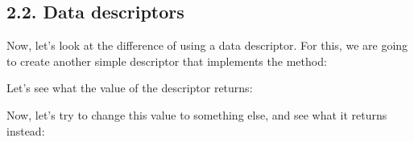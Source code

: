 \documentclass[a4paper,10pt,english]{sphinxmanual}
\begin{document}
\subsection{2.2. Data descriptors}
\label{\detokenize{chapters/6_descriptors/index:data-descriptors}}
Now, let’s look at the difference of using a data descriptor. For this, we are going to create
another simple descriptor that implements the  method:

\begin{sphinxVerbatim}[commandchars=\\\{\}]
 
       
           
             
         

       
          
        \PYG{p}{[}\PYG{p}{]}  

 
      
\end{sphinxVerbatim}

Let’s see what the value of the descriptor returns:

\begin{sphinxVerbatim}[commandchars=\\\{\}]
  
\end{sphinxVerbatim}

Now, let’s try to change this value to something else, and see what it returns instead:
\end{document}

